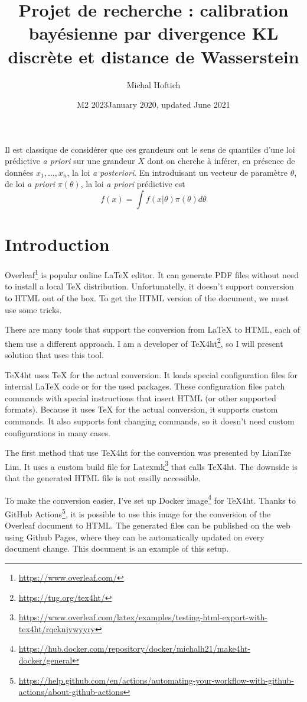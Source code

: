 \documentclass{article}
\title{Projet de recherche : calibration bay\'esienne par divergence KL discr\`ete et distance de Wasserstein}
\date{M2 2023}
\author{Michal Hoftich}
\date{January 2020, updated June 2021}
\newcommand\footurl[1]{\footnote{\url{#1}}}
\newcommand\urllink[2]{#1\footurl{#2}}
\begin{document}
\maketitle

Il est classique de consid\'erer que ces grandeurs ont le sens de quantiles d'une loi pr\'edictive {\it a priori} sur une grandeur $X$ dont on cherche \`a inf\'erer, en pr\'esence de donn\'ees $x_1,\ldots,x_n$, la loi {\it a posteriori}. En introduisant un vecteur de param\`etre $\theta$, de loi {\it a priori} $\pi(\theta)$, la loi {\it a priori} pr\'edictive est
$$
f(x)=\int f(x|\theta) \pi(\theta) d \theta
$$


\section{Introduction}

\urllink{Overleaf}{https://www.overleaf.com/} is popular online \LaTeX{}
editor. It can generate PDF files 
without need to install a local \TeX{} distribution. Unfortunatelly, it doesn't
support conversion to HTML out of the box. To get the HTML version of the
document, we must use some tricks.

There are many tools that support the conversion from \LaTeX{} to HTML, each of
them use a different approach. I am a developer of
\urllink{\TeX4ht}{https://tug.org/tex4ht/}, so I will present solution that
uses this tool. 

\TeX4ht uses \TeX{} for the actual conversion. It loads special configuration
files for internal \LaTeX{} code or for the used packages. These configuration
files patch commands with special instructions that insert HTML (or other
supported formats). Because it uses \TeX{} for the actual conversion, it
supports custom commands. It also supports font changing commands, so  it
doesn't need custom configurations in many cases.

The first method that use \TeX4ht for the conversion was presented by LianTze
Lim. It uses a custom build file for
\urllink{Latexmk}{https://www.overleaf.com/latex/examples/testing-html-export-with-tex4ht/rqcknjvwyyry} 
that calls \TeX4ht. The downside is that the generated HTML file is not easilly accessible.  

To make the conversion easier, I've set up \urllink{Docker image}{https://hub.docker.com/repository/docker/michalh21/make4ht-docker/general} for \TeX4ht. 
Thanks to \urllink{GitHub Actions}{https://help.github.com/en/actions/automating-your-workflow-with-github-actions/about-github-actions}, 
it is possible to use this image for the conversion of the Overleaf document to HTML. 
The generated files can be published on the web using Github Pages, where they can be automatically 
updated on every document change. This document is an example of this setup.
\end{document}
